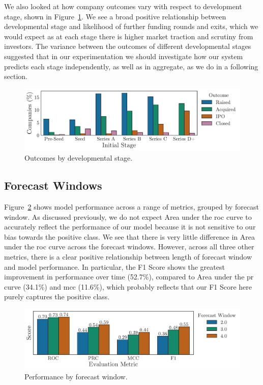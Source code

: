 ﻿\documentclass[../thesis/thesis.tex]{subfiles}
\begin{document}
We also looked at how company outcomes vary with respect to development stage, shown in Figure~\ref{fig:evaluation:outcome_stage}. We see a broad positive relationship between developmental stage and likelihood of further funding rounds and exits, which we would expect as at each stage there is higher market traction and scrutiny from investors. The variance between the outcomes of different developmental stages suggested that in our experimentation we should investigate how our system predicts each stage independently, as well as in aggregate, as we do in a following section.

\begin{figure}[!htb]
    \centering
    \includegraphics[width=\textwidth]{../figures/evaluation/outcomes_stage}
    \caption[Outcomes by developmental stage]{Outcomes by developmental stage.}
    \label{fig:evaluation:outcome_stage}
\end{figure}

\subsection{Forecast Windows}


Figure~\ref{fig:evaluation:performance_window} shows model performance across a range of metrics, grouped by forecast window. As discussed previously, we do not expect Area under the \gls{roc} curve to accurately reflect the performance of our model because it is not sensitive to our bias towards the positive class. We see that there is very little difference in Area under the \gls{roc} curve across the forecast windows. However, across all three other metrics, there is a clear positive relationship between length of forecast window and model performance. In particular, the F1 Score shows the greatest improvement in performance over time (52.7\%), compared to Area under the \gls{pr} curve (34.1\%) and \gls{mcc} (11.6\%), which probably reflects that our F1 Score here purely captures the positive class.

\begin{figure}[!htb]
    \centering
    \includegraphics[width=\textwidth]{../figures/evaluation/performance_window}
    \caption[Performance by forecast window]{Performance by forecast window.}
    \label{fig:evaluation:performance_window}
\end{figure}
\end{document}
